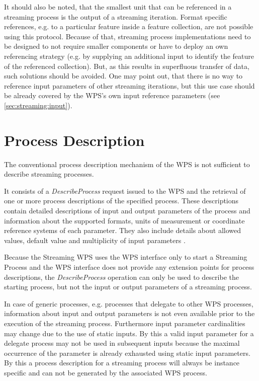    It should also be noted, that the smallest unit that can be referenced in a streaming process is the output of a streaming iteration. Format specific references, e.g. to a particular feature inside a feature collection, are not possible using this protocol. Because of that, streaming process implementations need to be designed to not require smaller components or have to deploy an own referencing strategy (e.g. by supplying an additional input to identify the feature of the referenced collection). But, as this results in superfluous transfer of data, such solutions should be avoided. One may point out, that there is no way to reference input parameters of other streaming iterations, but this use case should be already covered by the \ac{WPS}'s own input reference parameters (see \cref{sec:streaming:input}).

  \section{Process Description} %
    \label{sec:stream:processdescription}
    The conventional process description mechanism of the \ac{WPS} is not sufficient to describe streaming processes.

    It consists of a \emph{DescribeProcess} request issued to the \ac{WPS} and the retrieval of one or more process descriptions of the specified process. These descriptions contain detailed descriptions of input and output parameters of the process and information about the supported formats, units of measurement or coordinate reference systems of each parameter. They also include details about allowed values, default value and multiplicity of input parameters \citep{ogc:wps}.

    Because the Streaming \ac{WPS} uses the \ac{WPS} interface only to start a Streaming Process and the \ac{WPS} interface does not provide any extension points for process descriptions, the \emph{DescribeProcess} operation can only be used to describe the starting process, but not the input or output parameters of a streaming process.

    In case of generic processes, e.g. processes that delegate to other \ac{WPS} processes, information about input and output parameters is not even available prior to the execution of the streaming process. Furthermore input parameter cardinalities may change due to the use of static inputs. By this a valid input parameter for a delegate process may not be used in subsequent inputs because the maximal occurrence of the parameter is already exhausted using static input parameters. By this a process description for a streaming process will always be instance specific and can not be generated by the associated \ac{WPS} process.

